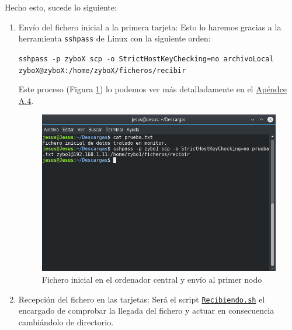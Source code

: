 Hecho esto, sucede lo siguiente:
\begin{enumerate}
	\item Envío del fichero inicial a la primera tarjeta: Esto lo haremos gracias a la herramienta \texttt{sshpass} de Linux con la siguiente orden:
	\begin{center}
		\texttt{sshpass -p zyboX scp -o StrictHostKeyChecking=no archivoLocal zyboX@zyboX:/home/zyboX/ficheros/recibir}
	\end{center}
	Este proceso (Figura \ref{Fichero inicial en el ordenador central y envío al primer nodo}) lo podemos ver más detalladamente en el \hyperlink{EnvioRecepcionFicheros}{Apéndce A.4}.
	\begin{figure}[h]
		\centering
		\includegraphics[scale=0.5]{Metodologia/Pruebas/Fichero_inicial_en_PC.png}
		\caption{Fichero inicial en el ordenador central y envío al primer nodo}
		\label{Fichero inicial en el ordenador central y envío al primer nodo}
	\end{figure}
\newpage
	\item Recepción del fichero en las tarjetas: Será el script \hyperlink{ScriptRecibiendo}{\texttt{Recibiendo.sh}} el encargado de comprobar la llegada del fichero y actuar en consecuencia cambiándolo de directorio.


\end{enumerate}
